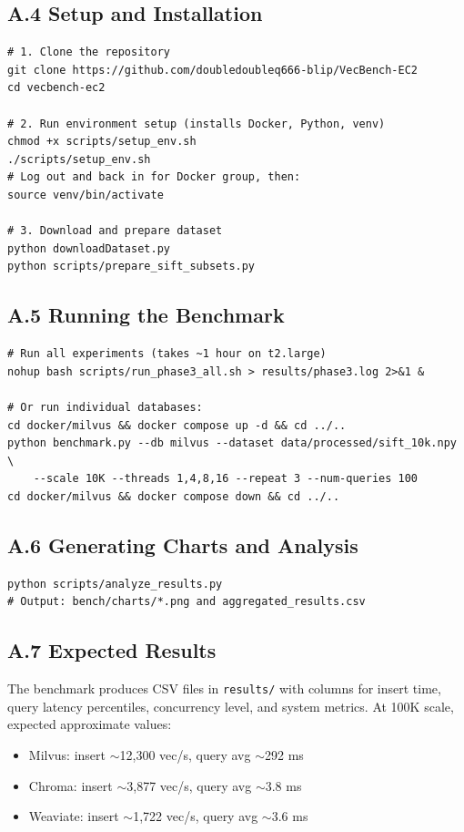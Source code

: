 \documentclass[12pt,a4paper]{article}
\begin{document}
\subsection*{A.4 Setup and Installation}

\begin{verbatim}
# 1. Clone the repository
git clone https://github.com/doubledoubleq666-blip/VecBench-EC2
cd vecbench-ec2

# 2. Run environment setup (installs Docker, Python, venv)
chmod +x scripts/setup_env.sh
./scripts/setup_env.sh
# Log out and back in for Docker group, then:
source venv/bin/activate

# 3. Download and prepare dataset
python downloadDataset.py
python scripts/prepare_sift_subsets.py
\end{verbatim}

\subsection*{A.5 Running the Benchmark}

\begin{verbatim}
# Run all experiments (takes ~1 hour on t2.large)
nohup bash scripts/run_phase3_all.sh > results/phase3.log 2>&1 &

# Or run individual databases:
cd docker/milvus && docker compose up -d && cd ../..
python benchmark.py --db milvus --dataset data/processed/sift_10k.npy \
    --scale 10K --threads 1,4,8,16 --repeat 3 --num-queries 100
cd docker/milvus && docker compose down && cd ../..
\end{verbatim}

\subsection*{A.6 Generating Charts and Analysis}

\begin{verbatim}
python scripts/analyze_results.py
# Output: bench/charts/*.png and aggregated_results.csv
\end{verbatim}

\subsection*{A.7 Expected Results}

The benchmark produces CSV files in \texttt{results/} with columns for insert time, query latency percentiles, concurrency level, and system metrics. At 100K scale, expected approximate values:
\begin{itemize}[nosep]
    \item Milvus: insert $\sim$12,300 vec/s, query avg $\sim$292 ms
    \item Chroma: insert $\sim$3,877 vec/s, query avg $\sim$3.8 ms
    \item Weaviate: insert $\sim$1,722 vec/s, query avg $\sim$3.6 ms
\end{itemize}
\end{document}
